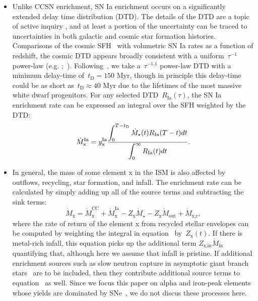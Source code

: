\documentclass[ms.tex]{subfiles}
\begin{document}
\begin{itemize}
	\item Unlike CCSN enrichment, SN Ia enrichment occurs on a significantly
	extended delay time distribution (DTD).
	The details of the DTD are a topic of active inquiry
	\citep[e.g.][]{Greggio2005, Strolger2020, Freundlich2021}, and at least a
	portion of the uncertainty can be traced to uncertainties in both galactic
	and cosmic star formation histories.
	Comparisons of the cosmic SFH~\citep[e.g.][]{Madau2014, Madau2017} with
	volumetric SN Ia rates as a function of redshift, the cosmic DTD appears
	broadly consistent with a uniform~$\tau^{-1}$ power-law (e.g.
	\citealp*{Maoz2012a, Maoz2012b, Graur2013};~\citealp{Graur2014}).
	Following~\citet{Weinberg2017}, we take a~$\tau^{-1.1}$ power-law DTD with a
	minimum delay-time of~$t_\text{D} = 150$ Myr, though in principle this
	delay-time could be as short as~$t_\text{D} \approx 40$ Myr due to the
	lifetimes of the most massive white dwarf progenitors.
	For any selected DTD~$R_\text{Ia}(\tau)$, the SN Ia enrichment rate can be
	expressed an integral over the SFH weighted by the DTD:
	\begin{equation}
	\dot{M}_\text{x}^\text{Ia} = y_\text{x}^\text{Ia} \frac{\displaystyle{
		\int_0^{T - t_\text{D}} \dot{M}_\star(t) R_\text{Ia}(T - t) dt
	}}{\displaystyle{
		\int_0^\infty R_\text{Ia}(t) dt
	}}.
	\end{equation}

	\item In general, the mass of some element x in the ISM is also affected by
	outflows, recycling, star formation, and infall.
	The enrichment rate can be calculated by simply adding up all of the source
	terms and subtracting the sink terms:
	\begin{equation}
	\label{eq:enrichment_eq}
	\dot{M}_\text{x} = \dot{M}_\text{x}^\text{CC} + \dot{M}_\text{x}^\text{Ia}
	- Z_\text{x}\dot{M}_\star - Z_\text{x}\dot{M}_\text{out} +
	\dot{M}_\text{x,r},
	\end{equation}
	where the rate of return of the element x from recycled stellar envelopes
	can be computed by weighting the integral in equation~
	by~$Z_\text{x}(t)$.
	If there is metal-rich infall, this equation picks up the additional term
	$Z_\text{x,in}\dot{M}_\text{in}$ quantifying that, although here we assume
	that infall is pristine.
	If additional enrichment sources such as slow neutron capture in asymptotic
	giant branch stars~\citep[e.g.][]{Cristallo2011, Cristallo2015, Ventura2013,
	Ventura2014, Ventura2018, Ventura2020, Karakas2016, Karakas2018} are to be
	included, then they contribute additional source terms to
	equation~ as well.
	Since we focus this paper on alpha and iron-peak elements whose yields are
	dominated by SNe~\citep[e.g.][]{Johnson2019}, we do not discus these
	processes here.

\end{itemize}
\end{document}
